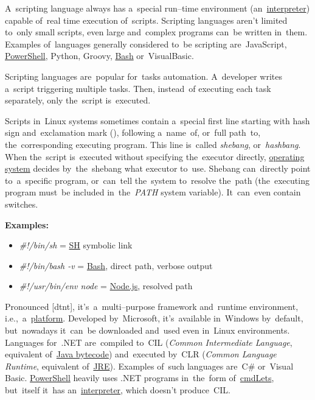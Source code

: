 A~scripting language always has a~special run--time environment (an~\hyperref[compiledinterpretedlanguages]{interpreter}) capable of~real time execution of~scripts. Scripting languages aren't limited to~only small scripts, even large and~complex programs can~be written in~them. Examples of~languages generally considered to~be scripting are~JavaScript, \hyperref[powershell]{PowerShell}, Python, Groovy, \hyperref[shbash]{Bash} or~VisualBasic.

Scripting languages are~popular for~tasks automation. A~developer writes a~script triggering multiple tasks. Then, instead~of executing each task separately, only the~script is~executed.

\label{shebang}
Scripts in~Linux systems sometimes contain a~special first line starting with hash sign and~exclamation mark (\textitquoted{\#!}), following a~name~of, or~full path~to, the~corresponding executing program. This line is~called \textit{shebang}, or~\textit{hashbang}. When the~script is~executed without specifying the~executor directly, \hyperref[os]{operating system} decides by~the~shebang what executor to~use. Shebang can~directly point to~a~specific program, or~can~tell the~system to~resolve the~path (the~executing program must~be included in~the~\textit{PATH} system variable). It~can~even contain switches.
\newline

\noindent \textbf{Examples:}
\begin{itemize}
    \item \textit{\#!/bin/sh} = \hyperref[shbash]{SH} symbolic link
    \item \textit{\#!/bin/bash -v} = \hyperref[shbash]{Bash}, direct path, verbose output
    \item \textit{\#!/usr/bin/env node} = \hyperref[nodejs]{Node.js}, resolved path
\end{itemize}

\label{dotnet}
Pronounced [d\textopeno{}tn\textepsilon{}t], it's~a~multi--purpose framework and~runtime environment, i.e.,~a~\hyperref[platform]{platform}. Developed by~Microsoft, it's~available in~Windows by~default, but~nowadays it~can~be downloaded and~used even in~Linux environments. Languages \mbox{for~.NET} are~compiled to~CIL (\textit{Common Intermediate Language}, equivalent of~\hyperref[bytecode]{Java bytecode}) and~executed by~CLR (\textit{Common Language Runtime}, equivalent of~\hyperref[jdkjrejvm]{JRE}). Examples of~such languages are~C\# or~Visual Basic. \hyperref[powershell]{PowerShell} heavily uses .NET programs in~the~form of~\hyperref[cmdlet]{cmdLets}, but~itself it~has an~\hyperref[compiledinterpretedlanguages]{interpreter}, which doesn't produce~CIL.

